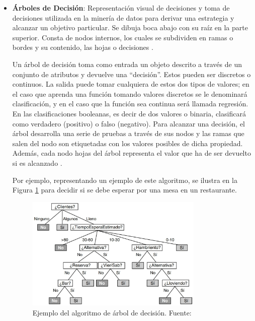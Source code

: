 \begin{itemize}
	\item \textbf{Árboles de Decisión}: Representación visual de decisiones y toma de decisiones utilizada en la minería de datos para derivar una estrategia y alcanzar un objetivo particular. Se dibuja boca abajo con su raíz en la parte superior. Consta de nodos internos, los cuales se subdividen en ramas o bordes y su contenido, las hojas o decisiones \parencite{tec_gupta2017decisiontree}.
	
	Un árbol de decisión toma como entrada un objeto descrito a través de un conjunto de atributos y devuelve una “decisión”. Estos pueden ser discretos o continuos. La salida puede tomar cualquiera de estos dos tipos de valores; en el caso que aprenda una función tomando valores discretos se le denominará clasificación, y en el caso que la función sea continua será llamada regresión. En las clasificaciones booleanas, es decir de dos valores o binaria, clasificará como verdadero (positivo) o falso (negativo). Para alcanzar una decisión, el árbol desarrolla una serie de pruebas a través de sus nodos y las ramas que salen del nodo son etiquetadas con los valores posibles de dicha propiedad. Además, cada nodo hojas del árbol representa el valor que ha de ser devuelto si es alcanzado \parencite{bk_russell2004intart}.
	
	Por ejemplo, representando un ejemplo de este algoritmo, se ilustra en la Figura \ref{2:fig40} para decidir si se debe esperar por una mesa en un restaurante.
	\begin{figure}[h]
		\begin{center}
			\includegraphics[width=0.8\textwidth]{2/figures/arbol_decision.jpg}
			\caption{Ejemplo del algoritmo de árbol de decisión. Fuente: \cite{bk_russell2004intart}}
			\label{2:fig40}
		\end{center}
	\end{figure}
\end{itemize}

